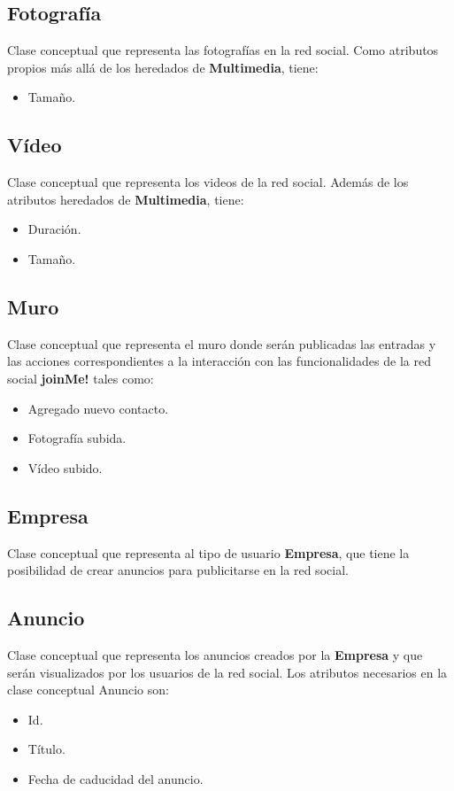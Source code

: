 \documentclass[12pt, a4paper, titlepage]{article}
\begin{document}
\subsection{Fotografía}
	Clase conceptual que representa las fotografías en la red social. Como atributos propios más allá de los heredados de \textbf{Multimedia}, tiene:
	\begin{itemize}
		\item Tamaño.
	\end{itemize}
\subsection{Vídeo}
	Clase conceptual que representa los videos de la red social. Además de los atributos heredados de \textbf{Multimedia}, tiene:
	\begin{itemize}
		\item Duración.
		\item Tamaño.
	\end{itemize}
\subsection{Muro}
	Clase conceptual que representa el muro donde serán publicadas las entradas y las acciones correspondientes a la interacción con las funcionalidades de la red social \textbf{joinMe!} tales como:
	\begin{itemize}
		\item Agregado nuevo contacto.
		\item Fotografía subida.
		\item Vídeo subido.
	\end{itemize}
\subsection{Empresa}
	Clase conceptual que representa al tipo de usuario \textbf{Empresa}, que tiene la posibilidad de crear anuncios para publicitarse en la red social.
\subsection{Anuncio}
	Clase conceptual que representa los anuncios creados por la \textbf{Empresa} y que serán visualizados por los usuarios de la red social. Los atributos necesarios en la clase conceptual Anuncio son:
	\begin{itemize}
		\item Id.
		\item Título.
		\item Fecha de caducidad del anuncio.
	\end{itemize}
\end{document}
